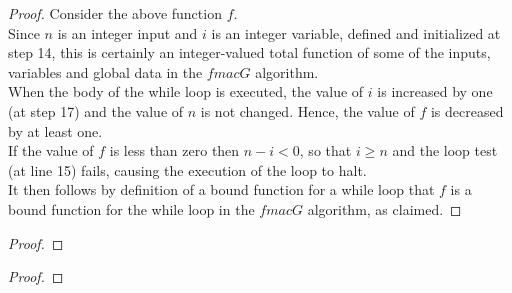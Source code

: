 \documentclass[12pt]{article}
\newenvironment{problem}[2][Problem]{\begin{trivlist}
\item[\hskip \labelsep {\bfseries #1}\hskip \labelsep {\bfseries #2.}]}{\end{trivlist}}
\begin{document}
\begin{proof} Consider the above function $f$. \\

    \noindent Since $n$ is an integer input and $i$ is an integer variable, defined and 
    initialized at step 14, this is certainly an integer-valued total function of
    some of the inputs, variables and global data in the $fmacG$ algorithm. \\

    \noindent When the body of the while loop is executed, the value of $i$ is increased
    by one (at step 17) and the value of $n$ is not changed. Hence, the value of $f$ is
    decreased by at least one. \\

    \noindent If the value of $f$ is less than zero then $n-i < 0$, so that $i \geq n$ and the loop
    test (at line 15) fails, causing the execution of the loop to halt. \\

    \noindent It then follows by definition of a bound function for a while loop that $f$ is a bound 
    function for the while loop in the $fmacG$ algorithm, as claimed.
\end{proof}



\begin{problem}{10}
\end{problem}

\begin{proof}
\end{proof}



\begin{problem}{11}
\end{problem}

\begin{proof}
\end{proof}



\begin{problem}{12}
\end{problem}
\end{document}

